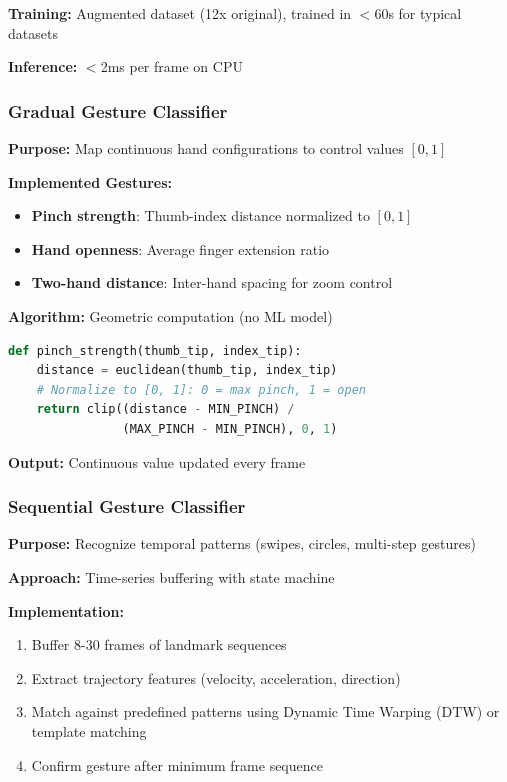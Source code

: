 \documentclass[11pt,a4paper]{article}
\begin{document}
\textbf{Training:} Augmented dataset (12x original), trained in $<$60s for typical datasets

\textbf{Inference:} $<$2ms per frame on CPU

\subsubsection{Gradual Gesture Classifier}

\textbf{Purpose:} Map continuous hand configurations to control values $[0,1]$

\textbf{Implemented Gestures:}
\begin{itemize}
\item \textbf{Pinch strength}: Thumb-index distance normalized to $[0,1]$
\item \textbf{Hand openness}: Average finger extension ratio
\item \textbf{Two-hand distance}: Inter-hand spacing for zoom control
\end{itemize}

\textbf{Algorithm:} Geometric computation (no ML model)
\begin{lstlisting}[language=Python]
def pinch_strength(thumb_tip, index_tip):
    distance = euclidean(thumb_tip, index_tip)
    # Normalize to [0, 1]: 0 = max pinch, 1 = open
    return clip((distance - MIN_PINCH) / 
                (MAX_PINCH - MIN_PINCH), 0, 1)
\end{lstlisting}

\textbf{Output:} Continuous value updated every frame

\subsubsection{Sequential Gesture Classifier}

\textbf{Purpose:} Recognize temporal patterns (swipes, circles, multi-step gestures)

\textbf{Approach:} Time-series buffering with state machine

\textbf{Implementation:}
\begin{enumerate}
\item Buffer 8-30 frames of landmark sequences
\item Extract trajectory features (velocity, acceleration, direction)
\item Match against predefined patterns using Dynamic Time Warping (DTW) or template matching
\item Confirm gesture after minimum frame sequence
\end{enumerate}
\end{document}

